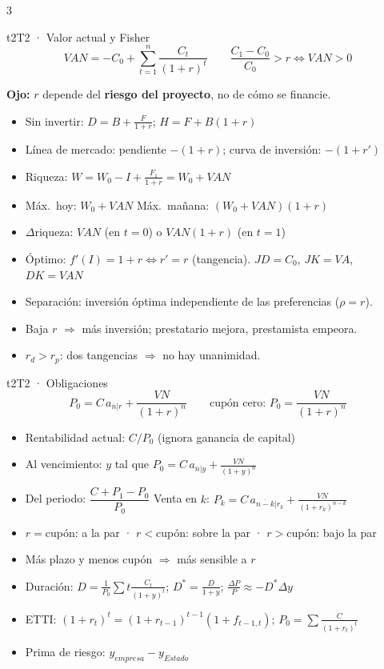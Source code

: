 \documentclass[9pt]{extarticle}
\newcommand{\sub}[1]{\par\smallskip{\color{black!75}\bfseries\footnotesize #1}\par}
\newcommand{\ojo}[1]{\par{\color{t3}\footnotesize\textbf{Ojo:} #1}\par}
\newcommand{\an}[2]{a_{\overline{#1}\rvert #2}}
\begin{document}
\begin{multicols*}{3}
\begin{bloque}{t2}{T2 · Valor actual y Fisher}
\[VAN = -C_0 + \sum_{t=1}^{n}\frac{C_t}{(1+r)^t}\qquad \frac{C_1-C_0}{C_0} > r \iff VAN>0\]
\ojo{$r$ depende del \textbf{riesgo del proyecto}, no de cómo se financie.}
\sub{Modelo de Fisher (2 periodos)}
\begin{itemize}
\item Sin invertir: $D = B + \frac{F}{1+r}$; \; $H = F + B(1+r)$
\item Línea de mercado: pendiente $-(1+r)$; curva de inversión: $-(1+r')$
\item Riqueza: $W = W_0 - I + \frac{F_1}{1+r} = W_0 + VAN$
\item Máx.\ hoy: $W_0+VAN$ \; Máx.\ mañana: $(W_0+VAN)(1+r)$
\item $\Delta$riqueza: $VAN$ (en $t=0$) o $VAN(1+r)$ (en $t=1$)
\item Óptimo: $f'(I)=1+r \iff r'=r$ (tangencia). $JD=C_0$, $JK=VA$, $DK=VAN$
\item Separación: inversión óptima independiente de las preferencias ($\rho=r$).
\item Baja $r$ $\Rightarrow$ más inversión; prestatario mejora, prestamista empeora.
\item $r_d>r_p$: dos tangencias $\Rightarrow$ no hay unanimidad.
\end{itemize}
\end{bloque}

\begin{bloque}{t2}{T2 · Obligaciones}
\[P_0 = C\,\an{n}{r} + \frac{VN}{(1+r)^n}\qquad \text{cupón cero: } P_0=\frac{VN}{(1+r)^n}\]
\begin{itemize}
\item Rentabilidad actual: $C/P_0$ (ignora ganancia de capital)
\item Al vencimiento: $y$ tal que $P_0 = C\,\an{n}{y} + \frac{VN}{(1+y)^n}$
\item Del periodo: $\dfrac{C+P_1-P_0}{P_0}$ \quad Venta en $k$: $P_k = C\,\an{n-k}{r_k} + \frac{VN}{(1+r_k)^{n-k}}$
\item $r=$cupón: a la par · $r<$cupón: sobre la par · $r>$cupón: bajo la par
\item Más plazo y menos cupón $\Rightarrow$ más sensible a $r$
\item Duración: $D=\frac{1}{P_0}\sum t\frac{C_t}{(1+y)^t}$; \; $D^*=\frac{D}{1+y}$; \; $\frac{\Delta P}{P}\approx -D^*\Delta y$
\item ETTI: $(1+r_t)^t=(1+r_{t-1})^{t-1}(1+f_{t-1,t})$; \; $P_0=\sum\frac{C}{(1+r_t)^t}$
\item Prima de riesgo: $y_{empresa}-y_{Estado}$
\end{itemize}
\end{bloque}


\end{multicols*}
\end{document}
